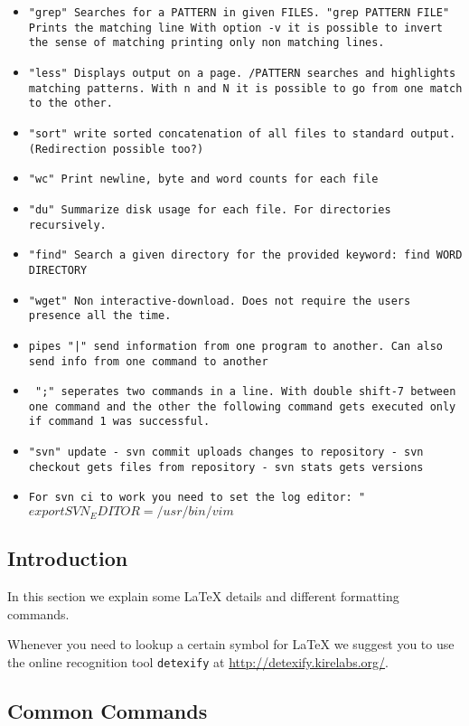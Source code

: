 \documentclass[10pt,a4paper]{scrartcl}
\begin{document}
\begin{itemize}
\item \texttt{"grep" Searches for a PATTERN in given FILES. "grep PATTERN FILE" Prints the matching line With option -v it is possible to invert the sense of matching printing only non matching lines.}
\item \texttt{"less" Displays output on a page. /PATTERN searches and highlights matching patterns. With n and N it is possible to go from one match to the other.}
\item \texttt{"sort" write sorted concatenation of all files to standard output. (Redirection possible too?)}
\item \texttt{"wc" Print newline, byte and word counts for each file}
\item \texttt{"du" Summarize disk usage for each file. For directories recursively.}
\item \texttt{"find" Search a given directory for the provided keyword: find WORD DIRECTORY}
\item \texttt{"wget" Non interactive-download. Does not require the users presence all the time.}
\item \texttt{pipes "|" send information from one program to another. Can also send info from one command to another} 
\item \texttt{ ";" seperates two commands in a line. With double shift-7 between one command and the other the following command gets executed only if command 1 was successful.}
\item \texttt{"svn" update  - svn commit uploads changes to repository - svn checkout gets files from repository - svn stats gets versions}

\item \texttt{For svn ci to work you need to set the log editor: "$export SVN_EDITOR=/usr/bin/vim$}
\end{itemize}

\subsection{Introduction} 

In this section we explain some \LaTeX\xspace details and different formatting
commands.

Whenever you need to lookup a certain symbol for \LaTeX\xspace we suggest you to use
the online recognition tool \texttt{detexify} at \url{http://detexify.kirelabs.org/}.


\subsection{Common Commands}
\end{document}
